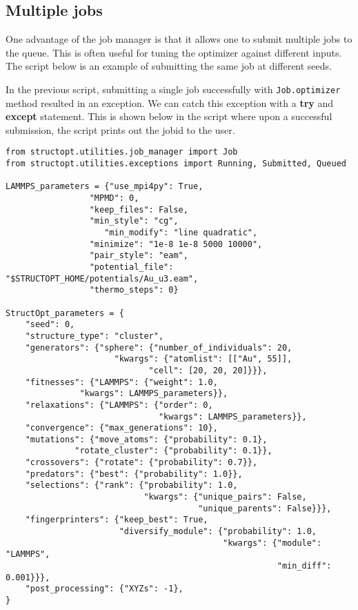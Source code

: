 \documentclass[11pt]{article}
\begin{document}
\subsection{Multiple jobs}
\label{sec:orgheadline4}
One advantage of the job manager is that it allows one to submit multiple jobs to the queue. This is often useful for tuning the optimizer against different inputs. The script below is an example of submitting the same job at different seeds.

In the previous script, submitting a single job successfully with \texttt{Job.optimizer} method resulted in an exception. We can catch this exception with a \textbf{try} and \textbf{except} statement. This is shown below in the script where upon a successful submission, the script prints out the jobid to the user.

\begin{verbatim}
from structopt.utilities.job_manager import Job
from structopt.utilities.exceptions import Running, Submitted, Queued

LAMMPS_parameters = {"use_mpi4py": True,
	             "MPMD": 0,
	             "keep_files": False,
	             "min_style": "cg",
                    "min_modify": "line quadratic",
	             "minimize": "1e-8 1e-8 5000 10000",
	             "pair_style": "eam",
	             "potential_file": "$STRUCTOPT_HOME/potentials/Au_u3.eam",
	             "thermo_steps": 0}

StructOpt_parameters = {
    "seed": 0,
    "structure_type": "cluster",
    "generators": {"sphere": {"number_of_individuals": 20,
		              "kwargs": {"atomlist": [["Au", 55]],
			                 "cell": [20, 20, 20]}}},
    "fitnesses": {"LAMMPS": {"weight": 1.0,
	           "kwargs": LAMMPS_parameters}},
    "relaxations": {"LAMMPS": {"order": 0,
                               "kwargs": LAMMPS_parameters}},
    "convergence": {"max_generations": 10},
    "mutations": {"move_atoms": {"probability": 0.1},
	          "rotate_cluster": {"probability": 0.1}},
    "crossovers": {"rotate": {"probability": 0.7}},
    "predators": {"best": {"probability": 1.0}},
    "selections": {"rank": {"probability": 1.0,
                            "kwargs": {"unique_pairs": False,
                                       "unique_parents": False}}},
    "fingerprinters": {"keep_best": True,
                       "diversify_module": {"probability": 1.0,
                                            "kwargs": {"module": "LAMMPS",
                                                       "min_diff": 0.001}}},
    "post_processing": {"XYZs": -1},
}


\end{verbatim}
\end{document}
